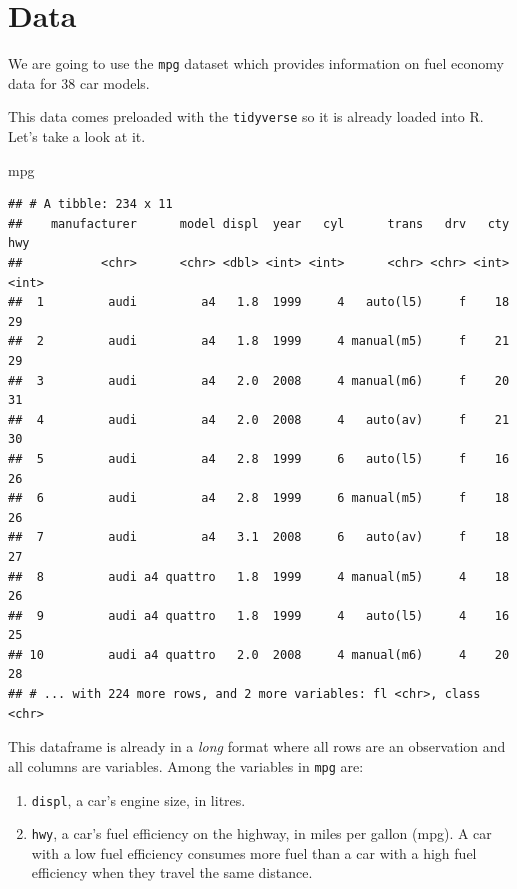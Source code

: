\documentclass[]{book}
\newenvironment{Shaded}{\begin{snugshade}}{\end{snugshade}}
\newcommand{\NormalTok}[1]{{#1}}
\theoremstyle{definition}
\theoremstyle{definition}
\theoremstyle{definition}
\theoremstyle{remark}
\begin{document}
\section{Data}\label{data}

We are going to use the \texttt{mpg} dataset which provides information
on fuel economy data for 38 car models.

This data comes preloaded with the \texttt{tidyverse} so it is already
loaded into R. Let's take a look at it.

\begin{Shaded}
\begin{Highlighting}[]
\NormalTok{mpg}
\end{Highlighting}
\end{Shaded}

\begin{verbatim}
## # A tibble: 234 x 11
##    manufacturer      model displ  year   cyl      trans   drv   cty   hwy
##           <chr>      <chr> <dbl> <int> <int>      <chr> <chr> <int> <int>
##  1         audi         a4   1.8  1999     4   auto(l5)     f    18    29
##  2         audi         a4   1.8  1999     4 manual(m5)     f    21    29
##  3         audi         a4   2.0  2008     4 manual(m6)     f    20    31
##  4         audi         a4   2.0  2008     4   auto(av)     f    21    30
##  5         audi         a4   2.8  1999     6   auto(l5)     f    16    26
##  6         audi         a4   2.8  1999     6 manual(m5)     f    18    26
##  7         audi         a4   3.1  2008     6   auto(av)     f    18    27
##  8         audi a4 quattro   1.8  1999     4 manual(m5)     4    18    26
##  9         audi a4 quattro   1.8  1999     4   auto(l5)     4    16    25
## 10         audi a4 quattro   2.0  2008     4 manual(m6)     4    20    28
## # ... with 224 more rows, and 2 more variables: fl <chr>, class <chr>
\end{verbatim}

This dataframe is already in a \emph{long} format where all rows are an
observation and all columns are variables. Among the variables in
\texttt{mpg} are:

\begin{enumerate}
\def\labelenumi{\arabic{enumi}.}
\item
  \texttt{displ}, a car's engine size, in litres.
\item
  \texttt{hwy}, a car's fuel efficiency on the highway, in miles per
  gallon (mpg). A car with a low fuel efficiency consumes more fuel than
  a car with a high fuel efficiency when they travel the same distance.
\end{enumerate}
\end{document}
